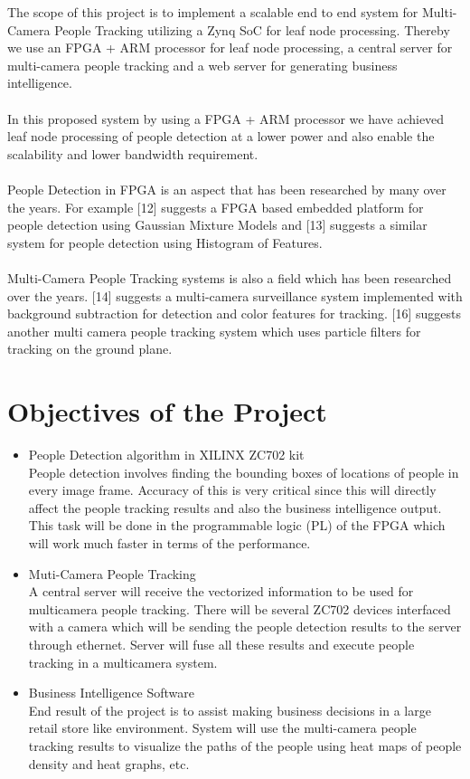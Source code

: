 \documentclass[12pt,a4paper]{report}
\begin{document}
The scope of this project is to implement a scalable end to end system for Multi-Camera People Tracking utilizing a Zynq SoC for leaf node processing. Thereby we use an FPGA + ARM processor for leaf node processing, a central server for multi-camera people tracking and a web server for generating business intelligence.\\\\
In this proposed system by using a FPGA + ARM processor we have achieved leaf node processing of people detection at a lower power and also enable the scalability and lower bandwidth requirement. \\\\
People Detection in FPGA is an aspect that has been researched by many over the
years. For example [12] suggests a FPGA based embedded platform for people detection using Gaussian Mixture Models and [13] suggests a similar system for people detection using Histogram of Features.\\\\
Multi-Camera People Tracking systems is also a field which has been researched over the years. [14] suggests a multi-camera surveillance system implemented with background subtraction for detection and color features for tracking. [16] suggests another multi camera people tracking system which uses particle filters for tracking on the ground plane.

\section{Objectives of the Project }

\begin{itemize}
\item  People Detection algorithm in XILINX ZC702 kit\\
People detection involves ﬁnding the bounding boxes of locations of people in every image frame. Accuracy of this is very critical since this will directly affect the people tracking results and also the business intelligence output. This task will be done in the programmable logic (PL) of the FPGA which will work much faster in terms of the performance. 

\item Muti-Camera People Tracking\\
A central server will receive the vectorized information to be used for multicamera people tracking. There will be several ZC702 devices interfaced with a camera which will be sending the people detection results to the server through ethernet. Server will fuse all these results and execute people tracking in a multicamera system. 

\item  Business Intelligence Software \\
End result of the project is to assist making business decisions in a large retail store like environment. System will use the multi-camera people tracking results to visualize the paths of the people using heat maps of people density and heat graphs, etc.



\end{itemize}
\newpage
\end{document}
